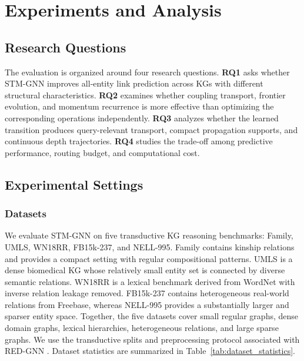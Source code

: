 \documentclass[a4paper,fleqn]{cas-sc}
\begin{document}
\section{Experiments and Analysis}\label{sec:experiments}

\subsection{Research Questions}\label{subsec:research_questions}

The evaluation is organized around four research questions. \textbf{RQ1} asks
whether STM-GNN improves all-entity link prediction across KGs with different
structural characteristics. \textbf{RQ2} examines whether coupling transport,
frontier evolution, and momentum recurrence is more effective than optimizing
the corresponding operations independently. \textbf{RQ3} analyzes whether the
learned transition produces query-relevant transport, compact propagation
supports, and continuous depth trajectories. \textbf{RQ4} studies the trade-off
among predictive performance, routing budget, and computational cost.

\subsection{Experimental Settings}\label{subsec:experimental_settings}

\subsubsection{Datasets}\label{subsec:datasets}

We evaluate STM-GNN on five transductive KG reasoning benchmarks: Family,
UMLS, WN18RR, FB15k-237, and NELL-995. Family contains kinship relations and
provides a compact setting with regular compositional patterns. UMLS is a dense
biomedical KG whose relatively small entity set is connected by diverse semantic
relations. WN18RR is a lexical benchmark derived from WordNet with inverse
relation leakage removed. FB15k-237 contains heterogeneous real-world relations
from Freebase, whereas NELL-995 provides a substantially larger and sparser
entity space. Together, the five datasets cover small regular graphs, dense
domain graphs, lexical hierarchies, heterogeneous relations, and large sparse
graphs. We use the transductive splits and preprocessing protocol associated
with RED-GNN \citep{zhang2022knowledge}. Dataset statistics are summarized in
Table~\ref{tab:dataset_statistics}.
\end{document}
